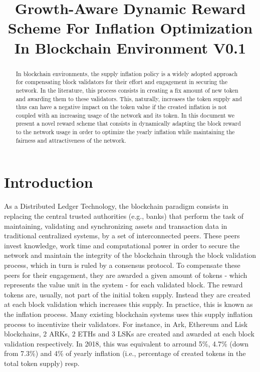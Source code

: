 \documentclass[conference]{IEEEtran}
\begin{document}
\title{Growth-Aware Dynamic Reward Scheme For Inflation Optimization In Blockchain Environment \small{V0.1}}

\author{
\and
{}
}

\maketitle

\begin{abstract}
In blockchain environments, the supply inflation policy is a widely adopted approach for compensating block validators for their effort and engagement in securing the network. In the literature, this process consists in creating a fix amount of new token and awarding them to these validators. This, naturally, increases the token supply and thus can have a negative impact on the token value if the created inflation is not coupled with an increasing usage of the network and its token. In this document we present a novel reward scheme that consists in dynamically adapting the block reward to the network usage in order to optimize the yearly inflation while maintaining the fairness and attractiveness of the network.  
\end{abstract}

\section{Introduction}
As a Distributed Ledger Technology, the blockchain paradigm consists in replacing the central trusted authorities (e.g., banks) that perform the task of maintaining, validating and synchronizing assets and transaction data in traditional centralized systems, by a set of interconnected peers. These peers invest knowledge, work time and computational power in order to secure the network and maintain the integrity of the blockchain through the block validation process, which in turn is ruled by a consensus protocol. To compensate these peers for their engagement, they are awarded a given amount of tokens - which represents the value unit in the system - for each validated block. The reward tokens are, usually, not part of the initial token supply. Instead they are created at each block validation which increases this supply. In practice, this is known as the inflation process. Many existing blockchain systems uses this supply inflation process to incentivize their validators. For instance, in Ark, Ethereum and Lisk blockchains, 2 ARKs, 2 ETHs and 3 LSKs are created and awarded at each block validation respectively. In 2018, this was equivalent to arround 5\%, 4.7\% (down from 7.3\%) and 4\% of yearly inflation (i.e., percentage of created tokens in the total token supply) resp.
\end{document}
